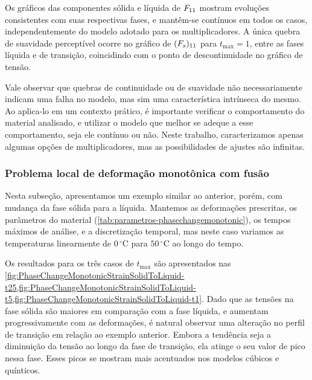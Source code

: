 \documentclass[Tese.tex]{subfiles}
\begin{document}
Os gráficos das componentes sólida e líquida de $F_{11}$ mostram evoluções consistentes com suas respectivas fases, e mantêm-se contínuos em todos os casos, independentemente do modelo adotado para os multiplicadores. A única quebra de suavidade perceptível ocorre no gráfico de $(F_s)_{11}$ para $t_\text{max}=1$, entre as fases líquida e de transição, coincidindo com o ponto de descontinuidade no gráfico de tensão.

Vale observar que quebras de continuidade ou de suavidade não necessariamente indicam uma falha no modelo, mas sim uma característica intrínseca do mesmo. Ao aplica-lo em um contexto prático, é importante verificar o comportamento do material analisado, e utilizar o modelo que melhor se adeque a esse comportamento, seja ele contínuo ou não. Neste trabalho, caracterizamos apenas algumas opções de multiplicadores, mas as possibilidades de ajustes são infinitas.



\subsubsection{Problema local de deformação monotônica com fusão}\label{subsec:local2}

Nesta subseção, apresentamos um exemplo similar ao anterior, porém, com mudança da fase sólida para a líquida. Mantemos as deformações prescritas, os parâmetros do material (\cref{tab:parametros-phasechangemonotonic}), os tempos máximos de análise, e a discretização temporal, mas neste caso variamos as temperaturas linearmente de $0\,^{\circ}$C para $50\,^{\circ}$C ao longo do tempo.

Os resultados para os três casos de $t_\text{max}$ são apresentados nas  \cref{fig:PhaseChangeMonotonicStrainSolidToLiquid-t25,fig:PhaseChangeMonotonicStrainSolidToLiquid-t5,fig:PhaseChangeMonotonicStrainSolidToLiquid-t1}. Dado que as tensões na fase sólida são maiores em comparação com a fase líquida, e aumentam progressivamente com as deformações, é natural observar uma alteração no perfil de transição em relação ao exemplo anterior. Embora a tendência seja a diminuição da tensão ao longo da fase de transição, ela atinge o seu valor de pico nessa fase. Esses picos se mostram mais acentuados nos modelos cúbicos e quínticos.
\end{document}
